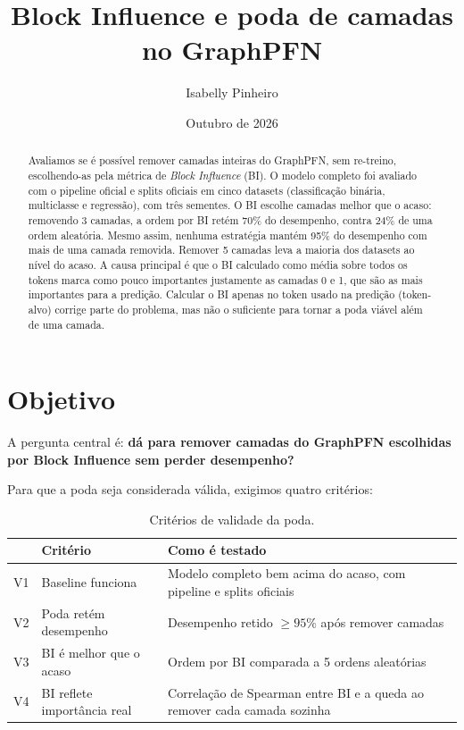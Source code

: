 \documentclass[11pt,a4paper]{article}
\title{Block Influence e poda de camadas no GraphPFN}
\author{Isabelly Pinheiro}
\date{Outubro de 2026}
\begin{document}
\maketitle

\begin{abstract}
Avaliamos se é possível remover camadas inteiras do GraphPFN, sem re-treino, escolhendo-as pela métrica de \emph{Block Influence} (BI). O modelo completo foi avaliado com o pipeline oficial e splits oficiais em cinco datasets (classificação binária, multiclasse e regressão), com três sementes. O BI escolhe camadas melhor que o acaso: removendo 3 camadas, a ordem por BI retém 70\% do desempenho, contra 24\% de uma ordem aleatória. Mesmo assim, nenhuma estratégia mantém 95\% do desempenho com mais de uma camada removida. Remover 5 camadas leva a maioria dos datasets ao nível do acaso. A causa principal é que o BI calculado como média sobre todos os tokens marca como pouco importantes justamente as camadas 0 e 1, que são as mais importantes para a predição. Calcular o BI apenas no token usado na predição (token-alvo) corrige parte do problema, mas não o suficiente para tornar a poda viável além de uma camada.
\end{abstract}

\tableofcontents

\section{Objetivo}

A pergunta central é: \textbf{dá para remover camadas do GraphPFN escolhidas por Block Influence sem perder desempenho?}

Para que a poda seja considerada válida, exigimos quatro critérios:

\begin{table}[H]
\centering
\caption{Critérios de validade da poda.}
\label{tab:criterios}
\begin{tabular}{@{}clp{7.2cm}@{}}
\toprule
& Critério & Como é testado \\
\midrule
V1 & Baseline funciona & Modelo completo bem acima do acaso, com pipeline e splits oficiais \\
V2 & Poda retém desempenho & Desempenho retido $\geq 95\%$ após remover camadas \\
V3 & BI é melhor que o acaso & Ordem por BI comparada a 5 ordens aleatórias \\
V4 & BI reflete importância real & Correlação de Spearman entre BI e a queda ao remover cada camada sozinha \\
\bottomrule
\end{tabular}
\end{table}
\end{document}
